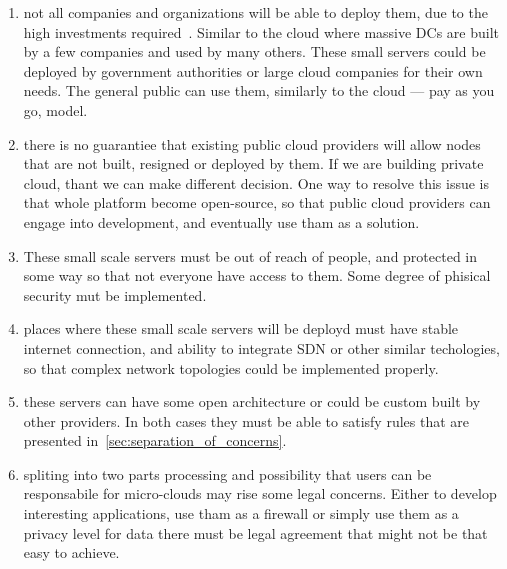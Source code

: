 \begin{enumerate}[start=1,label={(\bfseries \arabic*)}]
	\item not all companies and organizations will be able to deploy them, due to the high investments required~\cite{MonsalveCC18}. Similar to the cloud where massive DCs are built by a few companies and used by many others. These small servers could be deployed by government authorities or large cloud companies for their own needs. The general public can use them, similarly to the cloud --- pay as you go, model.
	\item there is no guarantiee that existing public cloud providers will allow nodes that are not built, resigned or deployed by them. If we are building private cloud, thant we can make different decision. One way to resolve this issue is that whole platform become open-source, so that public cloud providers can engage into development, and eventually use tham as a solution.
	\item These small scale servers must be out of reach of people, and protected in some way so that not everyone have access to them. Some degree of phisical security mut be implemented.
	\item places where these small scale servers will be deployd must have stable internet connection, and ability to integrate SDN or other similar techologies, so that complex network topologies could be implemented properly.
	\item these servers can have some open architecture or could be custom built by other providers. In both cases they must be able to satisfy rules that are presented in~\ref{sec:separation_of_concerns}.
	\item spliting into two parts processing and possibility that users can be responsabile for micro-clouds may rise some legal concerns. Either to develop interesting applications, use tham as a firewall or simply use them as a privacy level for data there must be legal agreement that might not be that easy to achieve.
\end{enumerate}
%
%